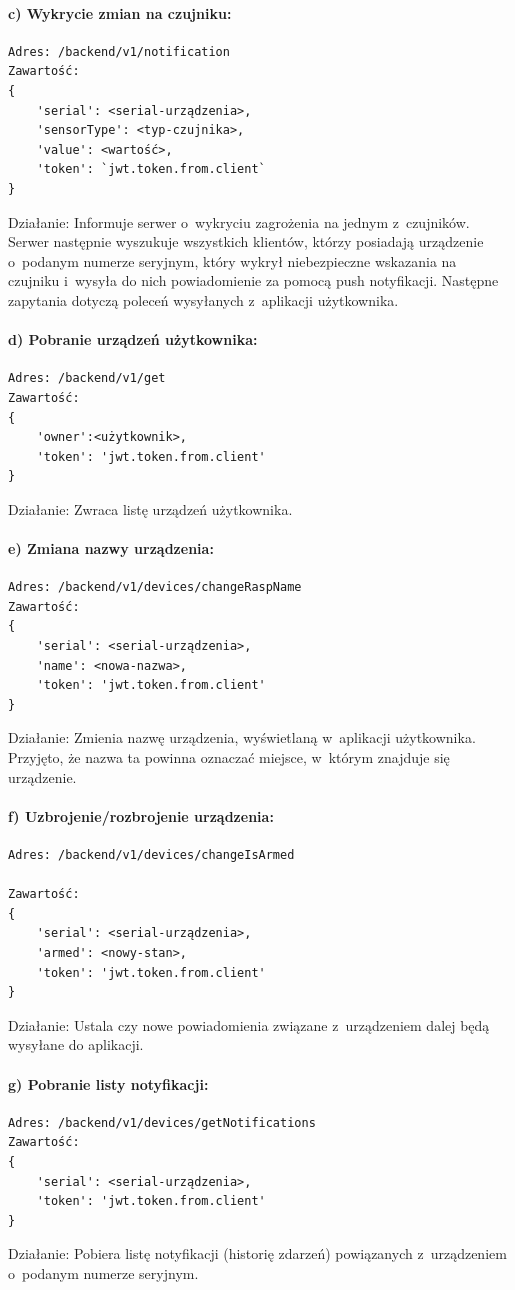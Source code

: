 \paragraph{c) Wykrycie zmian na czujniku:}
\begin{verbatim}
Adres: /backend/v1/notification
Zawartość: 
{
	'serial': <serial-urządzenia>, 
	'sensorType': <typ-czujnika>, 
	'value': <wartość>, 
	'token': `jwt.token.from.client`
}
\end{verbatim}
Działanie: Informuje serwer o~wykryciu zagrożenia na jednym z~czujników. Serwer następnie wyszukuje wszystkich klientów, którzy posiadają urządzenie o~podanym numerze seryjnym, który wykrył niebezpieczne wskazania na czujniku i~wysyła do nich powiadomienie za pomocą push notyfikacji. \newline
Następne zapytania dotyczą poleceń wysyłanych z~aplikacji użytkownika.
\paragraph{d) Pobranie urządzeń użytkownika:}
\begin{verbatim}
Adres: /backend/v1/get
Zawartość: 
{
	'owner':<użytkownik>, 
	'token': 'jwt.token.from.client'
}
\end{verbatim}
Działanie: Zwraca listę urządzeń użytkownika.
\paragraph{e) Zmiana nazwy urządzenia:}
\begin{verbatim}
Adres: /backend/v1/devices/changeRaspName
Zawartość:
{
	'serial': <serial-urządzenia>, 
	'name': <nowa-nazwa>, 
	'token': 'jwt.token.from.client'
}
\end{verbatim}
Działanie: Zmienia nazwę urządzenia, wyświetlaną w~aplikacji użytkownika. Przyjęto, że nazwa ta powinna oznaczać miejsce, w~którym znajduje się urządzenie.
\paragraph{f) Uzbrojenie/rozbrojenie urządzenia:}
\begin{verbatim}
Adres: /backend/v1/devices/changeIsArmed

Zawartość: 
{
	'serial': <serial-urządzenia>, 
	'armed': <nowy-stan>, 
	'token': 'jwt.token.from.client'
}
\end{verbatim}
Działanie: Ustala czy nowe powiadomienia związane z~urządzeniem dalej będą wysyłane do aplikacji.
\paragraph{g) Pobranie listy notyfikacji:}
\begin{verbatim}
Adres: /backend/v1/devices/getNotifications
Zawartość: 
{
	'serial': <serial-urządzenia>,  
	'token': 'jwt.token.from.client'
}
\end{verbatim}
Działanie: Pobiera listę notyfikacji (historię zdarzeń) powiązanych z~urządzeniem o~podanym numerze seryjnym.
